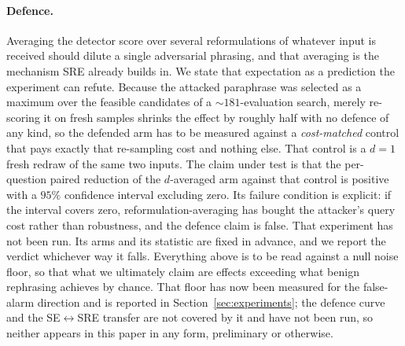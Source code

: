\paragraph{Defence.}
Averaging the detector score over several reformulations of whatever input is received
should dilute a single adversarial
phrasing, and that averaging is the mechanism SRE already builds in.
We state that expectation as a prediction the experiment can refute. Because the
attacked paraphrase was selected as a maximum over the feasible candidates of a
$\sim$$181$-evaluation search, merely re-scoring it on fresh samples shrinks the effect by
roughly half with no defence of any
kind, so the defended arm has to be measured against a \emph{cost-matched} control that pays
exactly that re-sampling cost and nothing else. That control is a $d{=}1$ fresh redraw of
the same two
inputs. The claim under test is that the per-question paired reduction of the $d$-averaged
arm against that control is positive with a $95\%$ confidence interval excluding zero. Its
failure condition is explicit: if the interval covers zero, reformulation-averaging has
bought the attacker's query cost rather than robustness, and the defence claim is false.
That experiment has not been run. Its arms and its statistic are fixed in advance, and we
report the verdict whichever way it falls. Everything above is to be read against a null noise floor, so that
what we ultimately claim are effects exceeding what benign rephrasing achieves by chance.
That floor has now been measured for the false-alarm direction and is reported in
Section~\ref{sec:experiments}; the defence curve and the SE$\leftrightarrow$SRE transfer are
not covered by it and have not been run, so neither appears in this paper in any form,
preliminary or otherwise.
